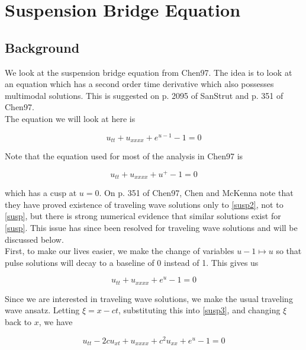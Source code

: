 \documentclass[12pt]{article}
\begin{document}
\section{Suspension Bridge Equation}

\subsection{Background}

We look at the suspension bridge equation from Chen97. The idea is to look at an equation which has a second order time derivative which also possesses multimodal solutions. This is suggested on p. 2095 of SanStrut and p. 351 of Chen97.\\

The equation we will look at here is

\begin{equation}\label{susp}
u_{tt} + u_{xxxx} + e^{u - 1} - 1 = 0
\end{equation}

Note that the equation used for most of the analysis in Chen97 is 

\begin{equation}\label{susp2}
u_{tt} + u_{xxxx} + u^+ - 1 = 0
\end{equation}

which has a cusp at $u = 0$. On p. 351 of Chen97, Chen and McKenna note that they have proved existence of traveling wave solutions only to \eqref{susp2}, not to \eqref{susp}, but there is strong numerical evidence that similar solutions exist for \eqref{susp}. This issue has since been resolved for traveling wave solutions and will be discussed below. \\

First, to make our lives easier, we make the change of variables $u - 1 \mapsto u$ so that pulse solutions will decay to a baseline of 0 instead of 1. This gives us

\begin{equation}\label{susp3}
u_{tt} + u_{xxxx} + e^{u} - 1 = 0
\end{equation}

Since we are interested in traveling wave solutions, we make the usual traveling wave ansatz. Letting $\xi = x - ct$, substituting this into \eqref{susp3}, and changing $\xi$ back to $x$, we have

\begin{equation}\label{susp3}
u_{tt} - 2 c u_{x t} + u_{xxxx} + c^2 u_{xx} + e^{u} - 1 = 0
\end{equation}
\end{document}
